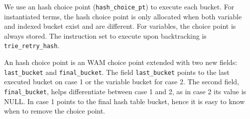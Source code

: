 We use an hash choice point (\texttt{hash\_choice\_pt}) to execute each bucket.
For instantiated terms, the hash choice point is only allocated when both variable and indexed bucket
exist and are different. For variables, the choice point is always stored. The instruction
set to execute upon backtracking is \texttt{trie\_retry\_hash}.

An hash choice point is an WAM choice point extended with two new fields:
\texttt{last\_bucket} and \texttt{final\_bucket}.
The field \texttt{last\_bucket} points to the last executed bucket on case 1 or the
variable bucket for case 2.
The second field, \texttt{final\_bucket}, helps differentiate between
case 1 and 2, as in case 2 its value is NULL. In case 1 points to the final hash table bucket,
hence it is easy to know when to remove the choice point.
